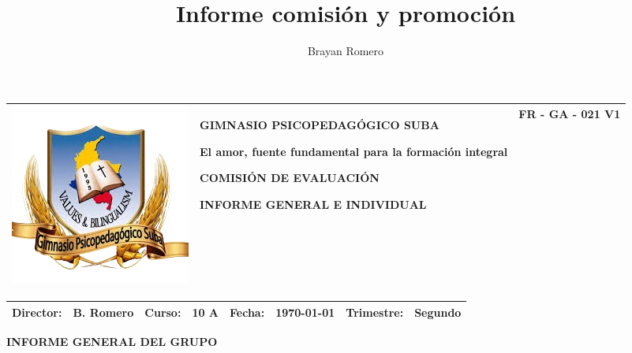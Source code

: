 \documentclass[spanish,11pt,a4paper]{article}
\title{Informe comisión y promoción}
\author{Brayan Romero}
\begin{document}
	
	\centering
	
	\begin{tabular}{|p{3cm}|p{12cm}|p{3cm}|}
		\hline
		\vspace{0.05cm}
		\centering
		\includegraphics[scale=0.35]{logo.png}
		&
		\begin{center}
			\textbf{GIMNASIO PSICOPEDAGÓGICO SUBA}
			
			\vspace{0.1cm}
			El amor, fuente fundamental para la formación integral
			
			\vspace{0.1cm}
			\textbf{COMISIÓN DE EVALUACIÓN}
			
			\vspace{0.1cm}
			\textbf{INFORME GENERAL E INDIVIDUAL}
		\end{center}&
		\vspace{1.25cm}
		FR - GA - 021 V1\\
		\hline
	\end{tabular}
	
	\vspace{0.4cm}
	
	\begin{tabular}{|c c|c c|c c|c c|}
		\hline
		\textbf{Director:} & B. Romero & \textbf{Curso:} & 10 A & \textbf{Fecha:} & \today & \textbf{Trimestre:} & Segundo \\
		\hline
	\end{tabular}
	\vspace{0.4cm}
	
	\textbf{INFORME GENERAL DEL GRUPO}
	
	\vspace{0.4cm}
	
\end{document}
